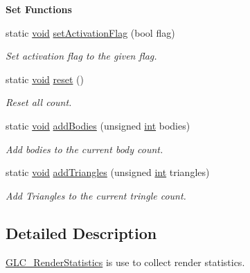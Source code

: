 \begin{Indent}{\bf Set Functions}\par
\begin{DoxyCompactItemize}
\item 
static \hyperlink{group___u_a_v_objects_plugin_ga444cf2ff3f0ecbe028adce838d373f5c}{void} \hyperlink{class_g_l_c___render_statistics_a17eb96c8f9931ca1c13dbb492d27ea9c}{set\-Activation\-Flag} (bool flag)
\begin{DoxyCompactList}\small\item\em Set activation flag to the given flag. \end{DoxyCompactList}\item 
static \hyperlink{group___u_a_v_objects_plugin_ga444cf2ff3f0ecbe028adce838d373f5c}{void} \hyperlink{class_g_l_c___render_statistics_aad88ddcf44e0fc6cd1a66654bbbb9c2c}{reset} ()
\begin{DoxyCompactList}\small\item\em Reset all count. \end{DoxyCompactList}\item 
static \hyperlink{group___u_a_v_objects_plugin_ga444cf2ff3f0ecbe028adce838d373f5c}{void} \hyperlink{class_g_l_c___render_statistics_a5abce85e666fb58d25b98b03a9da4043}{add\-Bodies} (unsigned \hyperlink{ioapi_8h_a787fa3cf048117ba7123753c1e74fcd6}{int} bodies)
\begin{DoxyCompactList}\small\item\em Add bodies to the current body count. \end{DoxyCompactList}\item 
static \hyperlink{group___u_a_v_objects_plugin_ga444cf2ff3f0ecbe028adce838d373f5c}{void} \hyperlink{class_g_l_c___render_statistics_ab8b87052309a46340fbd96c7c39eee35}{add\-Triangles} (unsigned \hyperlink{ioapi_8h_a787fa3cf048117ba7123753c1e74fcd6}{int} triangles)
\begin{DoxyCompactList}\small\item\em Add Triangles to the current tringle count. \end{DoxyCompactList}\end{DoxyCompactItemize}
\end{Indent}


\subsection{Detailed Description}
\hyperlink{class_g_l_c___render_statistics}{G\-L\-C\-\_\-\-Render\-Statistics} is use to collect render statistics. 


